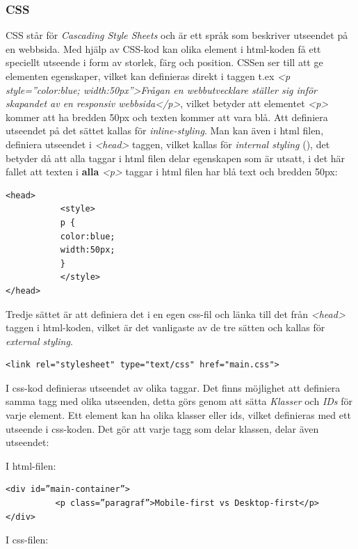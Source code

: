 \documentclass[11pt]{article}
\begin{document}
\subsubsection{CSS}
CSS står för \textit{Cascading Style Sheets} och är ett språk som beskriver utseendet på en webbsida.
Med hjälp av CSS-kod kan olika element i html-koden få ett speciellt utseende i form av storlek, färg och position. CSSen ser till att ge elementen egenskaper, vilket kan definieras direkt i taggen t.ex \textit{<p style=”color:blue; width:50px”>Frågan en webbutvecklare ställer sig inför skapandet av en responsiv webbsida</p>}, vilket betyder att elementet \textit{<p>} kommer att ha bredden 50px och texten kommer att vara blå. Att definiera utseendet på det sättet kallas för \textit{inline-styling}. Man kan även i html filen, definiera utseendet i \textit{<head>} taggen, vilket kallas för \textit{internal styling} (\cite{css}), det betyder då att alla taggar i html filen delar egenskapen som är utsatt, i det här fallet att texten i \textbf{alla} \textit{<p>} taggar i html filen har blå text och bredden 50px:

\vspace{0.3cm}
\begin{verbatim}
<head>
           <style>
           p {
           color:blue;
           width:50px;
           }
           </style>
</head>
\end{verbatim}
\vspace{0.3cm}

Tredje sättet är att definiera det i en egen css-fil och länka till det från \textit{<head>} taggen i html-koden, vilket är det vanligaste av de tre sätten och kallas för \textit{external styling}. 
\vspace{0.3cm}
\begin{verbatim}
<link rel="stylesheet" type="text/css" href="main.css">
\end{verbatim}
\vspace{0.3cm}

I css-kod definieras utseendet av olika taggar. Det finns möjlighet att definiera samma tagg med olika utseenden, detta görs genom att sätta \textit{Klasser} och \textit{IDs} för varje element. Ett element kan ha olika klasser eller ids, vilket definieras med ett utseende i css-koden. Det gör att varje tagg som delar klassen, delar även utseendet:

\vspace{0.3cm}
I html-filen:

\begin{verbatim}
<div id=”main-container”>
          <p class=”paragraf”>Mobile-first vs Desktop-first</p>
</div>
\end{verbatim}
\vspace{0.4cm}
I css-filen:
\end{document}
